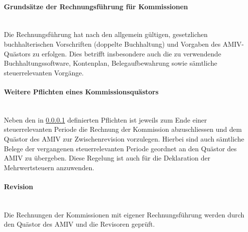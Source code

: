 \documentclass[a4paper,11pt]{article}
\begin{document}
\paragraph{Grundsätze der Rechnungsführung für Kommissionen}\label{Grundsaetze_Rechnung_Kommissionen} \ \\
Die Rechnungsführung hat nach den allgemein gültigen, gesetzlichen buchhalterischen Vorschriften (doppelte Buchhaltung) und Vorgaben des AMIV-Quästors zu erfolgen. Dies betrifft insbesondere auch die zu verwendende Buchhaltungssoftware, Kontenplan, Belegaufbewahrung sowie sämtliche steuerrelevanten Vorgänge.


\paragraph{Weitere Pflichten eines Kommissionsquästors} \ \\
Neben den in \ref{Grundsaetze_Rechnung_Kommissionen} definierten Pflichten ist jeweils zum Ende einer steuerrelevanten Periode die Rechnung der Kommission abzuschliessen und dem Quästor des AMIV zur Zwischenrevision vorzulegen. Hierbei sind auch sämtliche Belege der vergangenen steuerrelevanten Periode geordnet an den Quästor des AMIV zu übergeben. Diese Regelung ist auch für die Deklaration der Mehrwertsteuern anzuwenden.


\paragraph{Revision} \ \\
Die Rechnungen der Kommissionen mit eigener Rechnungsführung werden durch den Quästor des AMIV und die Revisoren geprüft.
\end{document}
